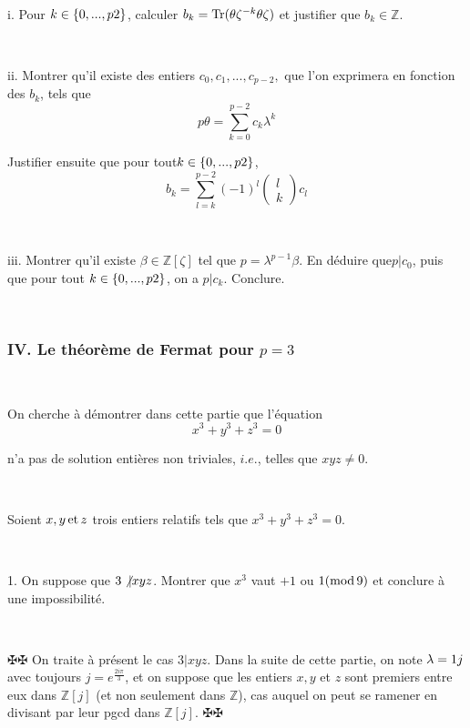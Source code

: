 \

{\hspace{3em}}i. Pour $k \in \{0, . . ., p \nonconverted{minus} 2\}$,
calculer $b_k = \tmop{Tr} (\theta \zeta^{- k} \nonconverted{minus} \theta
\zeta)$ et justifier que $b_k \in \mathbb{Z}$.

\

{\hspace{3em}}ii. Montrer qu'il existe des entiers $c_0, c_1, . . ., c_{p -
2},$ que l'on exprimera en fonction des $b_k$, tels que
\[ p \theta = \underset{k = 0}{\overset{p - 2}{\sum}} c_k \lambda^k \]


Justifier ensuite que pour tout$k \in \{0, . . ., p \nonconverted{minus}
2\}$,
\[ b_k = \underset{l = k}{\overset{p - 2}{\sum}} (- 1)^l \left(
   \begin{array}{c}
     l\\
     k
   \end{array} \right) c_l \]


\

{\hspace{3em}}iii. Montrer qu'il existe $\beta \in \mathbb{Z}[\zeta]$ tel que
$p = \lambda^{p - 1} \beta$. En d{\'e}duire que$p | c_0$, puis que pour tout
$k \in \{0, . . ., p \nonconverted{minus} 2\}$, on a $p | c_k$. Conclure.

\

\subsubsection*{IV. Le th{\'e}or{\`e}me de Fermat pour $p = 3$}

\

On cherche {\`a} d{\'e}montrer dans cette partie que l'{\'e}quation
\begin{equation}
  x^3 + y^3 + z^3 = 0
\end{equation}


n'a pas de solution enti{\`e}res non triviales, $i. e$., telles que $x y z
\neq 0.$

\

Soient $x, y \tmop{et} z$ trois entiers relatifs tels que $x^3 + y^3 + z^3 =
0$.

\

1. On suppose que $3 \not{| \nobracket} x y z$. Montrer que $x^3$ vaut $+ 1$
ou $\nonconverted{minus} 1 (\tmop{mod} 9)$ et conclure {\`a} une
impossibilit{\'e}.

\

$\maltese \maltese$ On traite {\`a} pr{\'e}sent le cas $3 | x y z$. Dans la
suite de cette partie, on note $\lambda = 1 \nonconverted{minus} j$ avec
toujours $j = e^{\frac{2 i \pi}{3}}$, et on suppose que les entiers $x, y$ et
$z$ sont premiers entre eux dans $\mathbb{Z}[j]$ (et non seulement dans
$\mathbb{Z}$), cas auquel on peut se ramener en divisant par leur pgcd dans
$\mathbb{Z}[j]$. $\maltese \maltese$

